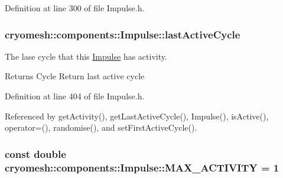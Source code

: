 \-Definition at line 300 of file \-Impulse.\-h.

\hypertarget{classcryomesh_1_1components_1_1Impulse_adc17d78b2127229c3acdaefb7b697f7e}{
\subsubsection[{last\-Active\-Cycle}]{ {\bf cryomesh\-::components\-::\-Impulse\-::last\-Active\-Cycle}}}\label{classcryomesh_1_1components_1_1Impulse_adc17d78b2127229c3acdaefb7b697f7e}


\-The lase cycle that this \hyperlink{classcryomesh_1_1components_1_1Impulse}{\-Impulse} has activity. 

\begin{DoxyReturn}{\-Returns}
\-Cycle \-Return last active cycle 
\end{DoxyReturn}


\-Definition at line 404 of file \-Impulse.\-h.



\-Referenced by get\-Activity(), get\-Last\-Active\-Cycle(), \-Impulse(), is\-Active(), operator=(), randomise(), and set\-First\-Active\-Cycle().

\hypertarget{classcryomesh_1_1components_1_1Impulse_af8e9eb795f1ea3cef81d6afeb7166ad2}{
\subsubsection[{\-M\-A\-X\-\_\-\-A\-C\-T\-I\-V\-I\-T\-Y}]{\setlength{\rightskip}{0pt plus 5cm}const double {\bf cryomesh\-::components\-::\-Impulse\-::\-M\-A\-X\-\_\-\-A\-C\-T\-I\-V\-I\-T\-Y} = 1}}\label{classcryomesh_1_1components_1_1Impulse_af8e9eb795f1ea3cef81d6afeb7166ad2}


